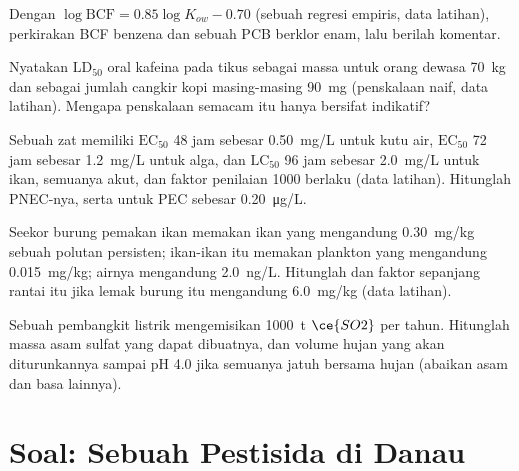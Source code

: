 \begin{exercise}[$\star\star$]\label{exo:b3:environmental-toxicology:8}
Dengan $\log\mathrm{BCF} = 0.85\log K_{ow} - 0.70$ (sebuah regresi empiris, data latihan), perkirakan BCF
benzena dan sebuah PCB berklor enam, lalu berilah komentar.
\end{exercise}

\begin{exercise}[$\star\star$]\label{exo:b3:environmental-toxicology:9}
Nyatakan $\mathrm{LD_{50}}$ oral kafeina pada tikus sebagai massa untuk orang dewasa \qty{70}{kg} dan sebagai jumlah cangkir kopi
masing-masing \qty{90}{mg} (penskalaan naif, data latihan). Mengapa penskalaan semacam itu hanya bersifat indikatif?
\end{exercise}

\begin{exercise}[$\star\star\star$]\label{exo:b3:environmental-toxicology:10}
Sebuah zat memiliki $\mathrm{EC_{50}}$ 48 jam sebesar \qty{0.50}{mg/L} untuk kutu air, $\mathrm{EC_{50}}$ 72 jam sebesar \qty{1.2}{mg/L} untuk alga,
dan $\mathrm{LC_{50}}$ 96 jam sebesar \qty{2.0}{mg/L} untuk ikan, semuanya akut, dan faktor penilaian 1000 berlaku
(data latihan). Hitunglah PNEC-nya, serta  untuk PEC sebesar \qty{0.20}{\micro g/L}.
\end{exercise}

\begin{exercise}[$\star\star\star$]\label{exo:b3:environmental-toxicology:11}
Seekor burung pemakan ikan memakan ikan yang mengandung \qty{0.30}{mg/kg} sebuah polutan persisten; ikan-ikan itu memakan
plankton yang mengandung \qty{0.015}{mg/kg}; airnya mengandung \qty{2.0}{ng/L}. Hitunglah  dan
faktor  sepanjang rantai itu jika lemak burung itu mengandung \qty{6.0}{mg/kg} (data
latihan).
\end{exercise}

\begin{exercise}[$\star\star\star$]\label{exo:b3:environmental-toxicology:12}
Sebuah pembangkit listrik mengemisikan \qty{1000}{t} $\ce{SO2}$ per tahun. Hitunglah massa asam sulfat yang dapat dibuatnya,
dan volume hujan yang akan diturunkannya sampai pH 4.0 jika semuanya jatuh bersama hujan (abaikan asam
dan basa lainnya).
\end{exercise}

\section{Soal: Sebuah Pestisida di Danau}

